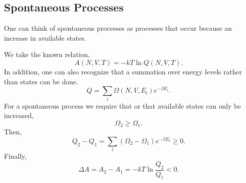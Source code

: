 \subsection{Spontaneous Processes}
One can think of spontaneous processes as processes that occur because an
increase in available states.

We take the known relation,
\[ A(N, V, T) = -k T \ln Q(N, V, T).\]
In addition, one can also recognize that a summation over energy levels rather
than states can be done.
\[ Q = \sum_{l}{\Omega(N, V, E_{l}) e^{- \beta E_{l}}}.\]
For a spontaneous process we require that or that available states can only be
increased,
\[ \Omega_2 \geq \Omega_1.\]
Then,
\[ Q_2 - Q_1 = \sum_{l}{(\Omega_2 - \Omega_1) e^{-\beta E_{l}}} \geq 0.\]
Finally,
\[ \Delta A = A_2 - A_1 = - kT \ln \frac{Q_2}{Q_1} < 0.\]
